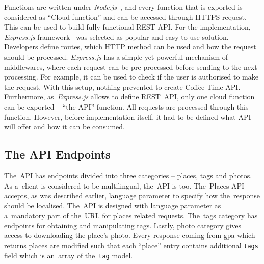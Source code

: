 Functions are written under \textit{Node.js}~\cite{node-js}, and every function that is exported is considered as ``Cloud function'' and can be accessed through HTTPS request. This can be used to build fully functional REST API. For the implementation, \textit{Express.js} framework~\cite{express-js} was selected as popular and easy to use solution. Developers define routes, which HTTP method can be used and how the request should be processed. 
\textit{Express.js} has a simple yet powerful mechanism of middlewares, where each request can be pre-processed before sending to the next processing. For example, it can be used to check if the user is authorised to make the request. With this setup, nothing prevented to create Coffee Time API. Furthermore, as~\textit{Express.js} allows to define REST~API, only one cloud function can be exported -- ``the API'' function. All requests are processed through this function. However, before implementation itself, it had to be defined what API will offer and how it can be consumed. 
\subsection{The API Endpoints}
The~API has endpoints divided into three categories -- places, tags and photos. As a~client is considered to be multilingual, the~API is too. The~Places API accepts, as was described earlier, language parameter to specify how the~response should be localised. The~API is designed with language parameter as a~mandatory part of the~URL for places related requests. The~tags category has endpoints for obtaining and manipulating tags. Lastly, photo category gives access to downloading the place's photo. Every response coming from \gls{gpa} which returns places are modified such that each ``place'' entry contains additional \verb|tags| field which is an~array of the~\verb|tag| model. 

